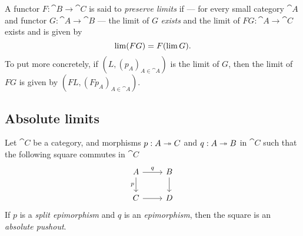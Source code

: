 \begin{definition}
\label{def:limit-preserving-functor}
A functor \(F: \cat B \to \cat C\) is said to \emph{preserve limits} if --- for
every small category \(\cat A\) and functor \(G: \cat A \to \cat B\) --- the
limit of \(G\) \emph{exists} and the limit of \(F G: \cat A \to \cat C\) exists
and is given by
\[
\operatorname{lim}(F G) = F(\operatorname{lim} G).
\]
To put more concretely, if \((L, (p_A)_{A \in \cat A})\) is the limit of \(G\),
then the limit of \(F G\) is given by \((F L, (F p_A)_{A \in \cat A})\).
\end{definition}

\subsection{Absolute limits}

\begin{proposition}
\label{prop:absolute-pushout}
Let \(\cat C\) be a category, and morphisms \(p: A \twoheadrightarrow C\) and \(q: A
\twoheadrightarrow B\) in \(\cat C\) such that the following square commutes in \(\cat C\)
\[
\begin{tikzcd}
A \ar[r, "q"] \ar[d, "p"'] &B \ar[d] \\
C \ar[r] &D
\end{tikzcd}
\]
If \(p\) is a \emph{split epimorphism} and \(q\) is an \emph{epimorphism},
then the square is an \emph{absolute pushout}.
\end{proposition}
